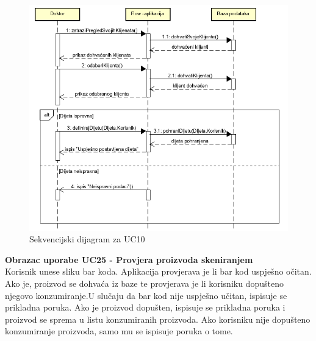 				
				\begin{figure}[H]
				\includegraphics[scale=0.95]{dijagrami/Sekvencijski/SD10.PNG}
				\centering
				\caption{Sekvencijski dijagram za UC10}
				\label{fig:promjene}
				\end{figure}
				\eject
				
				\textbf{Obrazac uporabe UC25 - Provjera proizvoda skeniranjem}\\
				Korisnik unese sliku bar koda. Aplikacija provjerava je li bar kod uspješno očitan. Ako je, proizvod se dohvaća iz baze te provjerava je li korisniku dopušteno njegovo konzumiranje.U slučaju da bar kod nije uspješno učitan, ispisuje se prikladna poruka. Ako je proizvod dopušten, ispisuje se prikladna poruka i proizvod se sprema u listu konzumiranih proizvoda. Ako korisniku nije dopušteno konzumiranje proizvoda, samo mu se ispisuje poruka o tome.
				
